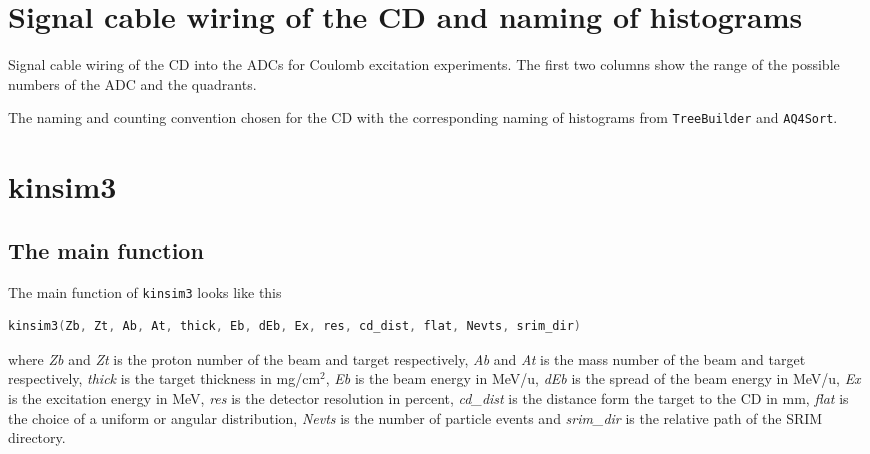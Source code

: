 \documentclass[twoside,english]{uiofysmaster/uiofysmaster}
\begin{document}
\begin{appendices}

\chapter{Signal cable wiring of the CD and naming of histograms}\label{a:signal}

\begin{table}[ht] 
	\centering 
	\caption{Signal cable wiring of the CD into the ADCs for Coulomb excitation experiments.
	The first two columns show the range of the possible numbers of the ADC and the quadrants.}
	
	\label{tab:ADC}
\end{table}


\begin{table}[ht] 
	\centering 
	\caption{The naming and counting convention chosen for the CD with the corresponding naming of histograms from \texttt{TreeBuilder} and \texttt{AQ4Sort}.}
	
	\label{tab:TBvsAQ4}
\end{table}




\chapter{kinsim3}\label{ch:cd_sim}

\section{The main function}
The main function of \texttt{kinsim3} looks like this
\begin{lstlisting}[language=c++]
kinsim3(Zb, Zt, Ab, At, thick, Eb, dEb, Ex, res, cd_dist, flat, Nevts, srim_dir)
\end{lstlisting}
where \textit{Zb} and \textit{Zt} is the proton number of the beam and target respectively, \textit{Ab} and \textit{At} is the mass number of the beam and target respectively, \textit{thick} is the target thickness in mg/cm$^2$, \textit{Eb} is the beam energy in MeV/u, \textit{dEb} is the spread of the beam energy in MeV/u, \textit{Ex} is the excitation energy in MeV, \textit{res} is the detector resolution in percent, \textit{cd\_dist} is the distance form the target to the CD in mm, \textit{flat} is the choice of a uniform or angular distribution, \textit{Nevts} is the number of particle events and \textit{srim\_dir} is the relative path of the SRIM directory.


\end{appendices}
\end{document}
